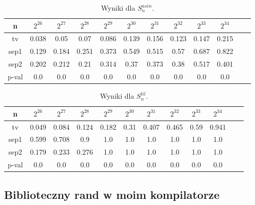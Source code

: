 \documentclass[a4paper,11pt,twoside]{book}
\newcommand{\Slil}[1]{S^{lil}_#1}
\newcommand{\Sasin}[1]{S^{asin}_#1}
\theoremstyle{definition}
\begin{document}
\begin{table}[ht!]
\centering
 \caption{Wyniki dla $\Sasin{n}$.}
 \label{tab:borland_asin}
\begin{tabular} {||c|c|c|c|c|c|c|c|c|c|c|c||}  
 \hline
     n &  $2^{26}$ &  $2^{27}$ &  $2^{28}$ &  $2^{29}$ &  $2^{30}$ &  $2^{31}$ &  $2^{32}$ &  $2^{33}$ &  $2^{34}$\\ \hline
    tv &  0.038 &   0.05 &   0.07 &  0.086 &  0.139 &  0.156 &  0.123 &  0.147 &  0.215\\ \hline
  sep1 &  0.129 &  0.184 &  0.251 &  0.373 &  0.549 &  0.515 &   0.57 &  0.687 &  0.822\\ \hline
  sep2 &  0.202 &  0.212 &   0.21 &  0.314 &   0.37 &  0.373 &   0.38 &  0.517 &  0.401\\ \hline
 p-val &    0.0 &    0.0 &    0.0 &    0.0 &    0.0 &    0.0 &    0.0 &    0.0 &    0.0\\ \hline


 
\end{tabular}  
\end{table}
\begin{table}[ht!]
\centering
 \caption{Wyniki dla $\Slil{n}$.}
 \label{tab:borland_lil}
\begin{tabular} {||c|c|c|c|c|c|c|c|c|c|c|c||}  
 \hline 
     n &  $2^{26}$ &  $2^{27}$ &  $2^{28}$ &  $2^{29}$ &  $2^{30}$ &  $2^{31}$ &  $2^{32}$ &  $2^{33}$ &  $2^{34}$\\ \hline
    tv &  0.049 &  0.084 &  0.124 &  0.182 &   0.31 &  0.407 &  0.465 &   0.59 &  0.941\\ \hline
  sep1 &  0.599 &  0.708 &    0.9 &    1.0 &    1.0 &    1.0 &    1.0 &    1.0 &    1.0\\ \hline
  sep2 &  0.179 &  0.233 &  0.276 &    1.0 &    1.0 &    1.0 &    1.0 &    1.0 &    1.0\\ \hline
 p-val &    0.0 &    0.0 &    0.0 &    0.0 &    0.0 &    0.0 &    0.0 &    0.0 &    0.0\\ \hline

 
\end{tabular}  
\end{table}

\FloatBarrier
\subsection{Biblioteczny rand w moim kompilatorze}
\end{document}
